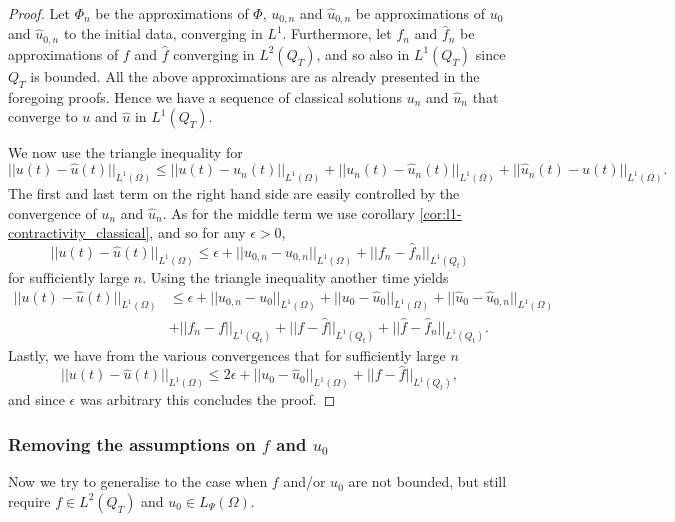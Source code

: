 \documentclass[11pt, a4paper]{article}
\begin{document}
\begin{proof}
Let $\Phi_n$ be the approximations of $\Phi$, $u_{0,n}$ and $\hat{u}_{0,n}$ be approximations of $u_0$ and $\hat{u}_{0,n}$ to the initial data, converging in $L^1$. Furthermore, let $f_n$ and $\hat{f}_n$ be approximations of $f$ and $\hat{f}$ converging in $L^2(Q_T)$, and so also in $L^1(Q_T)$ since $Q_T$ is bounded. All the above approximations are as already presented in the foregoing proofs. Hence we have a sequence of classical solutions $u_n$ and $\hat{u}_n$ that converge to $u$ and $\hat{u}$ in $L^1(Q_T)$.

We now use the triangle inequality for
\begin{equation*}
||u(t) - \hat{u}(t)||_{L^1(\Omega)} \leq ||u(t) - u_n(t)||_{L^1(\Omega)} + ||u_n(t) - \hat{u}_n(t)||_{L^1(\Omega)} + ||\hat{u}_n(t) - \hat{u}(t)||_{L^1(\Omega)}.
\end{equation*}
The first and last term on the right hand side are easily controlled by the convergence of $u_n$ and $\hat{u}_n$. As for the middle term we use corollary \ref{cor:l1-contractivity_classical}, and so for any $\epsilon > 0$,
\begin{equation*}
||u(t) - \hat{u}(t)||_{L^1(\Omega)} \leq \epsilon + ||u_{0,n} - \hat{u}_{0,n}||_{L^1(\Omega)} + ||f_n - \hat{f}_n||_{L^1(Q_t)}
\end{equation*}
for sufficiently large $n$.
Using the triangle inequality another time yields
\begin{align*}
||u(t) - \hat{u}(t)||_{L^1(\Omega)} &\leq \epsilon + ||u_{0,n} - u_0||_{L^1(\Omega)} + ||u_0 - \hat{u}_0||_{L^1(\Omega)} + ||\hat{u}_0 -\hat{u}_{0,n}||_{L^1(\Omega)} \\
&+ ||f_n - f||_{L^1(Q_t)} + ||f - \hat{f}||_{L^1(Q_t)} + ||\hat{f}-\hat{f}_n||_{L^1(Q_t)}.
\end{align*}
Lastly, we have from the various convergences that for sufficiently large $n$  
\begin{equation*}
||u(t) - \hat{u}(t)||_{L^1(\Omega)} \leq 2\epsilon + ||u_0 - \hat{u}_0||_{L^1(\Omega)} + ||f - \hat{f}||_{L^1(Q_t)}, 
\end{equation*}
and since $\epsilon$ was arbitrary this concludes the proof.
\end{proof}

\subsubsection{Removing the assumptions on $f$ and $u_0$}
Now we try to generalise to the case when $f$ and/or $u_0$ are not bounded, but still require $f \in L^2(Q_T)$ and $u_0 \in L_{\Psi}(\Omega)$.
\end{document}
